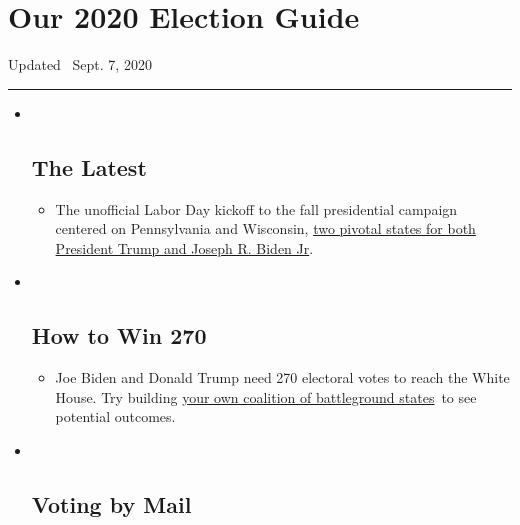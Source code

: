 \hypertarget{our-2020-election-guide}{%
\section{Our 2020 Election Guide}\label{our-2020-election-guide}}

Updated ~Sept. 7, 2020

\begin{center}\rule{0.5\linewidth}{\linethickness}\end{center}

\begin{itemize}
\item ~
  \hypertarget{the-latest}{%
  \subsection{The Latest}\label{the-latest}}

  \begin{itemize}
  \item
    The unofficial Labor Day kickoff to the fall presidential campaign
    centered on Pennsylvania and Wisconsin,
    \href{https://www.nytimes3xbfgragh.onion/2020/09/07/us/politics/wisconsin-biden-harris-trump-pence.html?action=click\&pgtype=Article\&state=default\&region=BELOW_MAIN_CONTENT\&context=storylines_guide}{two
    pivotal states for both President Trump and Joseph R. Biden Jr}.
  \end{itemize}
\item ~
  \hypertarget{how-to-win-270}{%
  \subsection{How to Win 270}\label{how-to-win-270}}

  \begin{itemize}
  \item
    Joe Biden and Donald Trump need 270 electoral votes to reach the
    White House. Try building
    \href{https://www.nytimes3xbfgragh.onion/interactive/2020/us/elections/election-states-biden-trump.html?action=click\&pgtype=Article\&state=default\&region=BELOW_MAIN_CONTENT\&context=storylines_guide}{your
    own coalition of battleground states}~to see potential outcomes.
  \end{itemize}
\item ~
  \hypertarget{voting-by-mail}{%
  \subsection{Voting by Mail}\label{voting-by-mail}}


\end{itemize}
